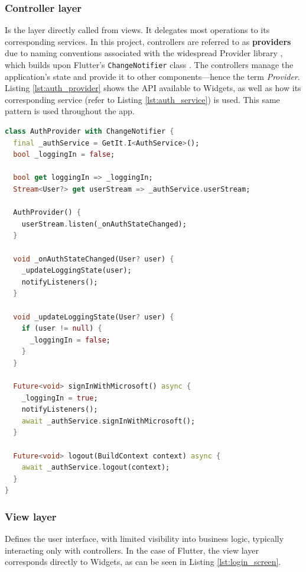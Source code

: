 \documentclass[
  digital,     %
  oneside,     %
  nosansbold,  %
  nocolorbold, %
  lof,         %
  lot,         %
]{fithesis4}
\begin{document}
\subsubsection{Controller layer}

Is the layer directly called from views. It delegates most operations to its corresponding services. In this project, controllers are referred to as \textbf{providers} due to naming conventions associated with the widespread Provider library \cite{providerPackage}, which builds upon Flutter's \texttt{ChangeNotifier} class \cite{flutterChangeNotifier}.  
The controllers manage the application's state and provide it to other components—hence the term \textit{Provider}. Listing \ref{lst:auth_provider} shows the \gls{API} available to Widgets, as well as how its corresponding service (refer to Listing \ref{lst:auth_service}) is used. This same pattern is used throughout the app.

\newpage
\begin{lstlisting}[language=Dart, caption={Controller layer example on AuthProvider class}, label={lst:auth_provider}, floatplacement=H, showstringspaces=false]
class AuthProvider with ChangeNotifier {
  final _authService = GetIt.I<AuthService>();
  bool _loggingIn = false;

  bool get loggingIn => _loggingIn;
  Stream<User?> get userStream => _authService.userStream;

  AuthProvider() {
    userStream.listen(_onAuthStateChanged);
  }

  void _onAuthStateChanged(User? user) {
    _updateLoggingState(user);
    notifyListeners();
  }

  void _updateLoggingState(User? user) {
    if (user != null) {
      _loggingIn = false;
    }
  }

  Future<void> signInWithMicrosoft() async {
    _loggingIn = true;
    notifyListeners();
    await _authService.signInWithMicrosoft();
  }

  Future<void> logout(BuildContext context) async {
    await _authService.logout(context);
  }
}
\end{lstlisting}

\newpage
\subsubsection{View layer}

Defines the user interface, with limited visibility into business logic, typically interacting only with controllers. In the case of Flutter, the view layer corresponds directly to Widgets, as can be seen in Listing \ref{lst:login_screen}.
\end{document}
